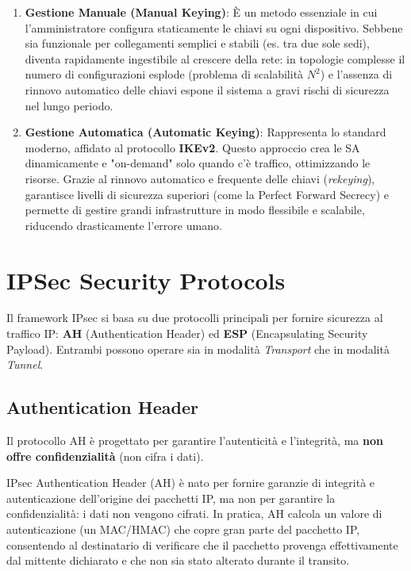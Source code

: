 \documentclass[a4paper, 11pt]{article}
\begin{document}
\begin{enumerate}
    \item \textbf{Gestione Manuale (Manual Keying)}:
    È un metodo essenziale in cui l'amministratore configura staticamente le chiavi su ogni dispositivo. Sebbene sia funzionale per collegamenti semplici e stabili (es. tra due sole sedi), diventa rapidamente ingestibile al crescere della rete: in topologie complesse il numero di configurazioni esplode (problema di scalabilità $N^2$) e l'assenza di rinnovo automatico delle chiavi espone il sistema a gravi rischi di sicurezza nel lungo periodo.

    \item \textbf{Gestione Automatica (Automatic Keying)}:
    Rappresenta lo standard moderno, affidato al protocollo \textbf{IKEv2}. Questo approccio crea le SA dinamicamente e "on-demand" solo quando c'è traffico, ottimizzando le risorse. Grazie al rinnovo automatico e frequente delle chiavi (\textit{rekeying}), garantisce livelli di sicurezza superiori (come la Perfect Forward Secrecy) e permette di gestire grandi infrastrutture in modo flessibile e scalabile, riducendo drasticamente l'errore umano.
\end{enumerate}

\newpage

\section{IPSec Security Protocols}

Il framework IPsec si basa su due protocolli principali per fornire sicurezza al traffico IP: \textbf{AH} (Authentication Header) ed \textbf{ESP} (Encapsulating Security Payload). Entrambi possono operare sia in modalità \textit{Transport} che in modalità \textit{Tunnel}.

\subsection{Authentication Header}

Il protocollo AH è progettato per garantire l'autenticità e l'integrità, ma \textbf{non offre confidenzialità} (non cifra i dati).

IPsec Authentication Header (AH) è nato per fornire garanzie di integrità e autenticazione dell'origine dei pacchetti IP, ma non per garantire la confidenzialità: i dati non vengono cifrati. In pratica, AH calcola un valore di autenticazione (un MAC/HMAC) che copre gran parte del pacchetto IP, consentendo al destinatario di verificare che il pacchetto provenga effettivamente dal mittente dichiarato e che non sia stato alterato durante il transito.
\end{document}
